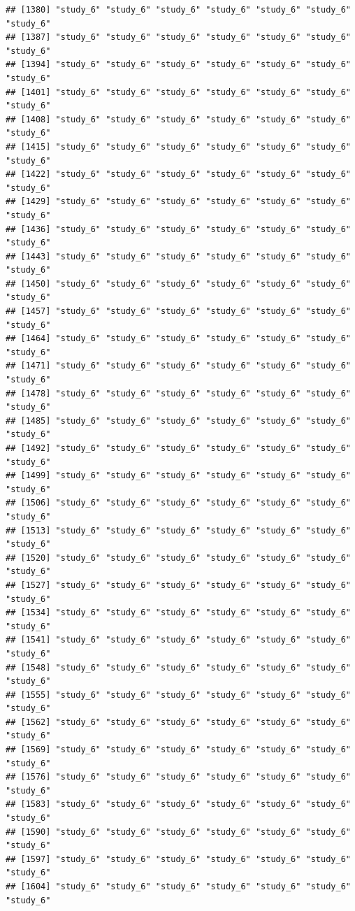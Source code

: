 \documentclass[
  american,
  man,floatsintext]{apa7}
\begin{document}
\begin{verbatim}
## [1380] "study_6" "study_6" "study_6" "study_6" "study_6" "study_6" "study_6"
## [1387] "study_6" "study_6" "study_6" "study_6" "study_6" "study_6" "study_6"
## [1394] "study_6" "study_6" "study_6" "study_6" "study_6" "study_6" "study_6"
## [1401] "study_6" "study_6" "study_6" "study_6" "study_6" "study_6" "study_6"
## [1408] "study_6" "study_6" "study_6" "study_6" "study_6" "study_6" "study_6"
## [1415] "study_6" "study_6" "study_6" "study_6" "study_6" "study_6" "study_6"
## [1422] "study_6" "study_6" "study_6" "study_6" "study_6" "study_6" "study_6"
## [1429] "study_6" "study_6" "study_6" "study_6" "study_6" "study_6" "study_6"
## [1436] "study_6" "study_6" "study_6" "study_6" "study_6" "study_6" "study_6"
## [1443] "study_6" "study_6" "study_6" "study_6" "study_6" "study_6" "study_6"
## [1450] "study_6" "study_6" "study_6" "study_6" "study_6" "study_6" "study_6"
## [1457] "study_6" "study_6" "study_6" "study_6" "study_6" "study_6" "study_6"
## [1464] "study_6" "study_6" "study_6" "study_6" "study_6" "study_6" "study_6"
## [1471] "study_6" "study_6" "study_6" "study_6" "study_6" "study_6" "study_6"
## [1478] "study_6" "study_6" "study_6" "study_6" "study_6" "study_6" "study_6"
## [1485] "study_6" "study_6" "study_6" "study_6" "study_6" "study_6" "study_6"
## [1492] "study_6" "study_6" "study_6" "study_6" "study_6" "study_6" "study_6"
## [1499] "study_6" "study_6" "study_6" "study_6" "study_6" "study_6" "study_6"
## [1506] "study_6" "study_6" "study_6" "study_6" "study_6" "study_6" "study_6"
## [1513] "study_6" "study_6" "study_6" "study_6" "study_6" "study_6" "study_6"
## [1520] "study_6" "study_6" "study_6" "study_6" "study_6" "study_6" "study_6"
## [1527] "study_6" "study_6" "study_6" "study_6" "study_6" "study_6" "study_6"
## [1534] "study_6" "study_6" "study_6" "study_6" "study_6" "study_6" "study_6"
## [1541] "study_6" "study_6" "study_6" "study_6" "study_6" "study_6" "study_6"
## [1548] "study_6" "study_6" "study_6" "study_6" "study_6" "study_6" "study_6"
## [1555] "study_6" "study_6" "study_6" "study_6" "study_6" "study_6" "study_6"
## [1562] "study_6" "study_6" "study_6" "study_6" "study_6" "study_6" "study_6"
## [1569] "study_6" "study_6" "study_6" "study_6" "study_6" "study_6" "study_6"
## [1576] "study_6" "study_6" "study_6" "study_6" "study_6" "study_6" "study_6"
## [1583] "study_6" "study_6" "study_6" "study_6" "study_6" "study_6" "study_6"
## [1590] "study_6" "study_6" "study_6" "study_6" "study_6" "study_6" "study_6"
## [1597] "study_6" "study_6" "study_6" "study_6" "study_6" "study_6" "study_6"
## [1604] "study_6" "study_6" "study_6" "study_6" "study_6" "study_6" "study_6"

\end{verbatim}
\end{document}
